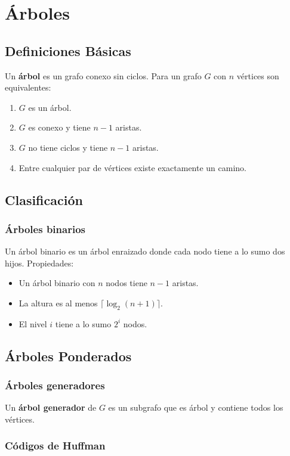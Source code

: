 \chapter{Árboles}

\section{Definiciones Básicas}
Un \textbf{árbol} es un grafo conexo sin ciclos. Para un grafo $G$ con $n$ vértices son equivalentes:
\begin{enumerate}
  \item $G$ es un árbol.
  \item $G$ es conexo y tiene $n-1$ aristas.
  \item $G$ no tiene ciclos y tiene $n-1$ aristas.
  \item Entre cualquier par de vértices existe exactamente un camino.
\end{enumerate}

\section{Clasificación}

\subsection{Árboles binarios}
Un árbol binario es un árbol enraizado donde cada nodo tiene a lo sumo dos hijos. Propiedades:
\begin{itemize}
  \item Un árbol binario con $n$ nodos tiene $n-1$ aristas.
  \item La altura es al menos $\lceil \log_2(n+1) \rceil$.
  \item El nivel $i$ tiene a lo sumo $2^i$ nodos.
\end{itemize}

\section{Árboles Ponderados}

\subsection{Árboles generadores}
Un \textbf{árbol generador} de $G$ es un subgrafo que es árbol y contiene todos los vértices.

\subsection{Códigos de Huffman}

